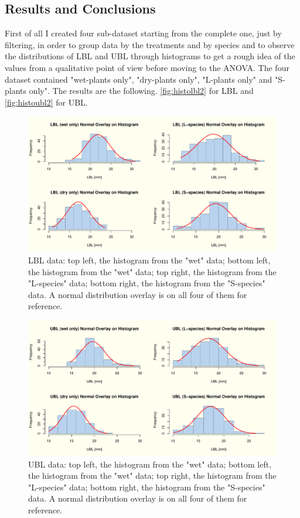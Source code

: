 \documentclass{article}
\begin{document}
\subsection{Results and Conclusions}
First of all I created four sub-dataset starting from the complete one, just by filtering, in order to group data by the treatments and by species and to observe the distributions of LBL and UBL through histograms to get a rough idea of the values from a qualitative point of view before moving to the ANOVA. The four dataset contained "wet-plants only", "dry-plants only", "L-plants only" and "S-plants only". The results are the following. \autoref{fig:histolbl2} for LBL and \autoref{fig:histoubl2} for UBL.
\iffalse
\begin{figure}[H]
\centering
  \includegraphics[scale=0.5]{histograms_lbl.pdf}
\caption{LBL data: top left, the histogram from the "wet" data; bottom left, the histogram from the "wet" data; top right, the histogram from the "L-species" data; bottom right, the histogram from the "S-species" data. A normal distribution overlay is on all four of them for reference.}
  \label{fig:histolbl}
\end{figure}
\begin{figure}[H]
\centering
  \includegraphics[scale=0.5]{histograms_ubl.pdf}
\caption{UBL data: top left, the histogram from the "wet" data; bottom left, the histogram from the "wet" data; top right, the histogram from the "L-species" data; bottom right, the histogram from the "S-species" data. A normal distribution overlay is on all four of them for reference.}
  \label{fig:histoubl}
\end{figure}
\end{document}
